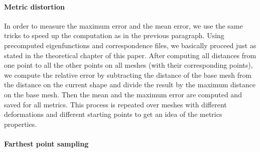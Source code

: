 \paragraph{Metric distortion}
In order to measure the maximum error and the mean error, we use the same tricks to speed up the computation as in the previous paragraph.
Using precomputed eigenfunctions and correspondence files, we basically proceed just as stated in the theoretical chapter of this paper.
After computing all distances from one point to all the other points on all meshes (with their corresponding points), we compute the relative error by subtracting the distance of the base mesh from the distance on the current shape and divide the result by the maximum distance on the base mesh.
Then the mean and the maximum error are computed and saved for all metrics.
This process is repeated over meshes with different deformations and different starting points to get an idea of the metrics properties.


\paragraph{Farthest point sampling}
